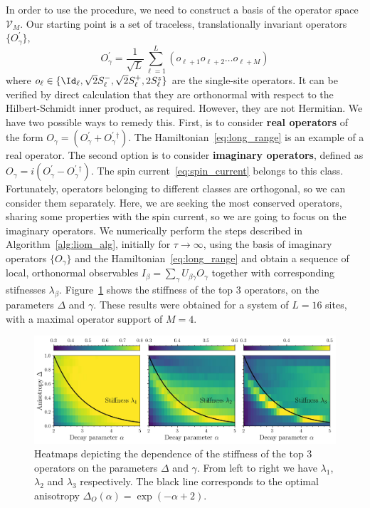 In order to use the procedure, we need to construct a basis of the operator space \(\mathcal{V}_M\).
Our starting point is a set of traceless, translationally invariant operators \(\{O^{\prime}_{\gamma}\}\),
\begin{equation}
  O^{\prime}_{\gamma} = \frac{1}{\sqrt{L}}\sum_{\ell=1}^L\left( o_{\ell+1}o_{\ell+2}\ldots o_{\ell+M} \right)
  \label{eq:operator_basis}
\end{equation}
where \(o_{\ell} \in \{\Id_{\ell}, \sqrt{2}\Sm_{\ell},\sqrt{2}\Sp_{\ell},2\Sz_{\ell}\}\) are the single-site operators.
It can be verified by direct calculation that they are orthonormal with respect to the Hilbert-Schmidt inner product,
as required. However, they are not Hermitian. We have two possible ways to remedy this. First, is
to consider \textbf{real operators} of the form \(O_{\gamma} = (O^{\prime}_{\gamma} + O^{\prime}_{\gamma}{}^{\dag})\).
The Hamiltonian~\eqref{eq:long_range} is an example of a real operator. The second option is to consider \textbf{imaginary operators},
defined as \(O_{\gamma} = i(O^{\prime}_{\gamma} - O^{\prime}_{\gamma}{}^{\dag})\). The spin current~\eqref{eq:spin_current}
belongs to this class. Fortunately, operators belonging to different classes are orthogonal, so we can
consider them separately. Here, we are seeking the most conserved operators, sharing some properties with
the spin current, so we are going to focus on the imaginary operators. We numerically perform the steps
described in Algorithm~\ref{alg:liom_alg}, initially for \(\tau\to\infty\), using the basis of imaginary operators \(\{O_{\gamma}\}\)
and the Hamiltonian~\eqref{eq:long_range} and obtain a sequence of local, orthonormal observables
\(I_{\beta} = \sum_{\gamma} U_{\beta\gamma} O_{\gamma}\) together with corresponding stifnesses \(\lambda_{\beta}\).
Figure~\ref{fig:stiffness} shows the stiffness of the top 3 operators, on the parameters \(\Delta\) and \(\gamma\).
These results were obtained for a system of \(L=16\) sites, with a maximal operator support of \(M=4\).

\begin{figure}[htbp]
  \centering
  \includegraphics[width=\linewidth]{Figures/stiffness.jpg}
  \caption{Heatmaps depicting the dependence of the stiffness of the top 3 operators on the parameters \(\Delta\) and \(\gamma\).
  From left to right we have \(\lambda_1\), \(\lambda_2\) and \(\lambda_3\) respectively. The black line corresponds
  to the optimal anisotropy \(\Delta_{O}(\alpha) = \exp(-\alpha + 2)\).}
  \label{fig:stiffness}
\end{figure}

